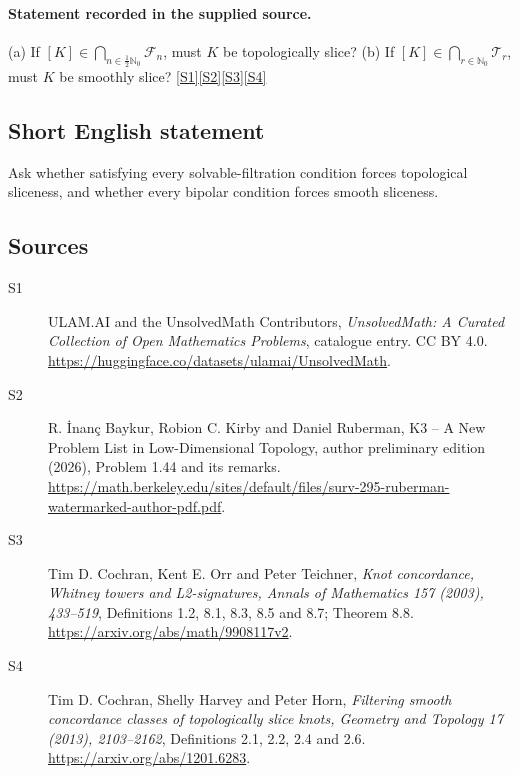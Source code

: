 \documentclass[11pt]{article}
\newcommand{\sref}[2]{\hyperlink{source:#1:#2}{[S#2]}}
\begin{document}
\paragraph{Statement recorded in the supplied source.}
(a) If $[K]\in\bigcap_{n\in\frac12\mathbb N_0}\mathcal F_n$, must $K$ be topologically slice? (b) If $[K]\in\bigcap_{r\in\mathbb N_0}\mathcal T_r$, must $K$ be smoothly slice? \sref{statement}{1}\sref{statement}{2}\sref{statement}{3}\sref{statement}{4}
\subsection{Short English statement}
Ask whether satisfying every solvable-filtration condition forces topological sliceness, and whether every bipolar condition forces smooth sliceness.
\subsection{Sources}
\begin{description}
\item[\hypertarget{source:statement:1}{S1}] ULAM.AI and the UnsolvedMath Contributors, \emph{UnsolvedMath: A Curated Collection of Open Mathematics Problems}, catalogue entry. CC BY 4.0. \url{https://huggingface.co/datasets/ulamai/UnsolvedMath}.
\item[\hypertarget{source:statement:2}{S2}] R. \.{I}nan\c{c} Baykur, Robion C. Kirby and Daniel Ruberman, K3 -- A New Problem List in Low-Dimensional Topology, author preliminary edition (2026), Problem 1.44 and its remarks. \url{https://math.berkeley.edu/sites/default/files/surv-295-ruberman-watermarked-author-pdf.pdf}.
\item[\hypertarget{source:statement:3}{S3}] Tim D. Cochran, Kent E. Orr and Peter Teichner, \emph{Knot concordance, Whitney towers and L2-signatures, Annals of Mathematics 157 (2003), 433--519}, Definitions 1.2, 8.1, 8.3, 8.5 and 8.7; Theorem 8.8. \url{https://arxiv.org/abs/math/9908117v2}.
\item[\hypertarget{source:statement:4}{S4}] Tim D. Cochran, Shelly Harvey and Peter Horn, \emph{Filtering smooth concordance classes of topologically slice knots, Geometry and Topology 17 (2013), 2103--2162}, Definitions 2.1, 2.2, 2.4 and 2.6. \url{https://arxiv.org/abs/1201.6283}.
\end{description}
\label{end:statement}
\end{document}
